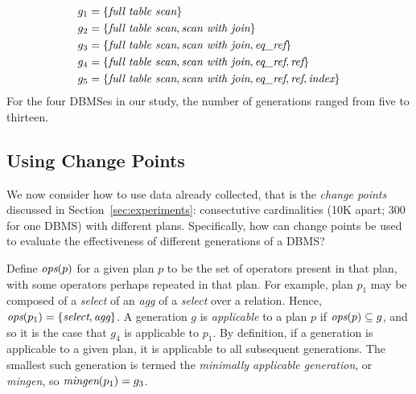 \documentclass[prodmode,acmtods]{acmsmall}
\begin{document}
\begin{align*}
g_1 &= \{ \hbox{\em full table scan} \}\\
g_2 &= \{ \hbox{\em full table scan}, \hbox{\em scan with join} \}\\
g_3 &= \{ \hbox{\em full table scan}, \hbox{\em scan with join}, \hbox{\em eq\_ref} \}\\
g_4 &= \{ \hbox{\em full table scan}, \hbox{\em scan with join}, \hbox{\em
  eq\_ref}, \hbox{\em ref} \}\\
g_5 &= \{ \hbox{\em full table scan}, \hbox{\em scan with join}, \hbox{\em
  eq\_ref}, \hbox{\em ref}, \hbox{\em index} \}
\end{align*}
For the four \hbox{DBMSes} in our study, the number of generations ranged from five
to thirteen. 

\subsection{Using Change Points}
We now consider how to use data already collected, that is the {\em change
  points} discussed in Section~\ref{sec:experiments}: consectutive
cardinalities (10K apart; 300 for one \hbox{DBMS}) with different
plans. Specifically, how can change points be used to evaluate the
effectiveness of different generations of a \hbox{DBMS}?

Define $\hbox{\em ops}(p)$ for a given plan $p$ to be the set of operators
present in that plan, with some operators perhaps repeated in that plan. 
For example, plan $p_1$ may be composed of a {\em select} of an {\em agg} of a {\em select} over a
relation. Hence,  $\hbox{\em ops}({p_1}) = \{\hbox{\em select}, \hbox{\em
    agg}\}$. A generation $g$ is {\em applicable} to a plan $p$ if
  $\hbox{\em ops}(p) \subseteq g$,  and so it is the case that $g_4$  is applicable to $p_1$. By
  definition, if a generation is applicable to a given plan, it is
  applicable to all subsequent generations. The smallest such generation is
  termed the {\em minimally applicable generation}, or {\em mingen}, so
  $\hbox{\em mingen}(p_1) = g_3$.

\end{document}
